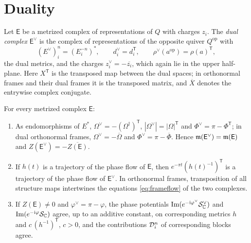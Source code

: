 \section{Duality}\label{sec:duality}

Let $\mathsf E$ be a metrized complex of representations of $Q$ with charges
$z_i$. The \emph{dual complex} $\mathsf E^\vee$ is the complex of
representations of the opposite quiver $Q^{\mathrm{op}}$ with
\[
 (E^\vee)_i^n=(E_i^{-n})^*,\qquad d_i^\vee=d_i^{\mathsf T},\qquad
 \rho^\vee(a^{\mathrm{op}})=\rho(a)^{\mathsf T},
\]
the dual metrics, and the charges $z_i^\vee=-\overline{z_i}$, which again lie
in the upper half-plane. Here $X^{\mathsf T}$ is the transposed map between
the dual spaces; in orthonormal frames and their dual frames it is the
transposed matrix, and $\overline X$ denotes the entrywise complex conjugate.

\begin{theorem}[Duality]\label{thm:duality}
For every metrized complex $\mathsf E$:
\begin{enumerate}
\item[(a)] As endomorphisms of $E^*$,
 $\Omega^\vee=-(\Omega^\dagger)^{\mathsf T}$, $|\Omega^\vee|=|\Omega|^{\mathsf T}$ and
 $\Phi^\vee=\pi-\Phi^{\mathsf T}$; in dual orthonormal frames,
 $\Omega^\vee=-\overline\Omega$ and $\Phi^\vee=\pi-\overline\Phi$. Hence
 $\mathfrak m(\mathsf E^\vee)=\mathfrak m(\mathsf E)$ and
 $Z(\mathsf E^\vee)=-\overline{Z(\mathsf E)}$.
\item[(b)] If $h(t)$ is a trajectory of the phase flow of $\mathsf E$, then
 $e^{-\pi t}(h(t)^{-1})^{\mathsf T}$ is a trajectory of the phase flow of
 $\mathsf E^\vee$. In orthonormal frames, transposition of all structure maps
 intertwines the equations \eqref{eq:frameflow} of the two complexes.
\item[(c)] If $Z(\mathsf E)\neq0$ and $\varphi^\vee=\pi-\varphi$, the phase
 potentials $\operatorname{Im}(e^{-\mathrm i\varphi^\vee}\mathcal S^\vee_{\mathbb C})$ and
 $\operatorname{Im}(e^{-\mathrm i\varphi}\mathcal S_{\mathbb C})$ agree, up to an additive constant, on
 corresponding metrics $h$ and $c\,(h^{-1})^{\mathsf T}$, $c>0$, and the
 contributions $\mathcal D_i^n$ of corresponding blocks agree.
\end{enumerate}
\end{theorem}


